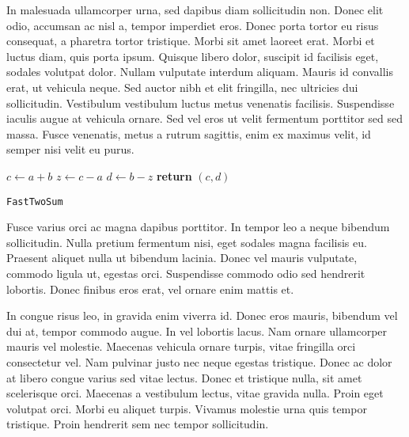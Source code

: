 \documentclass{article}
\begin{document}
In malesuada ullamcorper urna, sed dapibus diam sollicitudin non. Donec elit odio, accumsan ac nisl a, tempor imperdiet eros. Donec porta tortor eu risus consequat, a pharetra tortor tristique. Morbi sit amet laoreet erat. Morbi et luctus diam, quis porta ipsum. Quisque libero dolor, suscipit id facilisis eget, sodales volutpat dolor. Nullam vulputate interdum aliquam. Mauris id convallis erat, ut vehicula neque. Sed auctor nibh et elit fringilla, nec ultricies dui sollicitudin. Vestibulum vestibulum luctus metus venenatis facilisis. Suspendisse iaculis augue at vehicula ornare. Sed vel eros ut velit fermentum porttitor sed sed massa. Fusce venenatis, metus a rutrum sagittis, enim ex maximus velit, id semper nisi velit eu purus.

\begin{center}
	\begin{minipage}{0.5\linewidth} %
		\begin{algorithm}[H]
			\medskip
			$c \leftarrow a + b$ \;
			$z \leftarrow c - a$ \;
			$d \leftarrow b - z$ \;
			{\bf return} $(c,d)$ \;
			\caption{\texttt{FastTwoSum}} %
			\label{alg:fastTwoSum}   %
		\end{algorithm}
	\end{minipage}
\end{center}

Fusce varius orci ac magna dapibus porttitor. In tempor leo a neque bibendum sollicitudin. Nulla pretium fermentum nisi, eget sodales magna facilisis eu. Praesent aliquet nulla ut bibendum lacinia. Donec vel mauris vulputate, commodo ligula ut, egestas orci. Suspendisse commodo odio sed hendrerit lobortis. Donec finibus eros erat, vel ornare enim mattis et.

\begin{question}
	In congue risus leo, in gravida enim viverra id. Donec eros mauris, bibendum vel dui at, tempor commodo augue. In vel lobortis lacus. Nam ornare ullamcorper mauris vel molestie. Maecenas vehicula ornare turpis, vitae fringilla orci consectetur vel. Nam pulvinar justo nec neque egestas tristique. Donec ac dolor at libero congue varius sed vitae lectus. Donec et tristique nulla, sit amet scelerisque orci. Maecenas a vestibulum lectus, vitae gravida nulla. Proin eget volutpat orci. Morbi eu aliquet turpis. Vivamus molestie urna quis tempor tristique. Proin hendrerit sem nec tempor sollicitudin.
\end{question}
\end{document}
